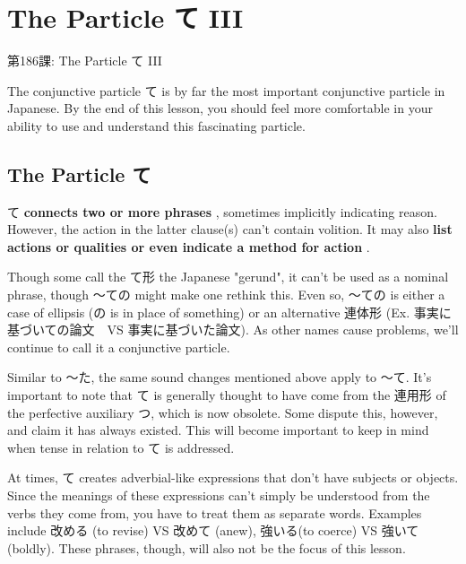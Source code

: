     
\chapter{The Particle て III}

\begin{center}
\begin{Large}
第186課: The Particle て III 
\end{Large}
\end{center}
 
\par{ The conjunctive particle て is by far the most important conjunctive particle in Japanese. By the end of this lesson, you should feel more comfortable in your ability to use and understand this fascinating particle. }
      
\section{The Particle て}
 
\par{ て \textbf{connects two or more phrases }, sometimes implicitly indicating reason. However, the action in the latter clause(s) can't contain volition. It may also \textbf{list actions or qualities or even indicate a method for action }. }

\par{ Though some call the て形 the Japanese "gerund", it can't be used as a nominal phrase, though ～ての might make one rethink this. Even so, ～ての is either a case of ellipsis (の is in place of something) or an alternative 連体形 (Ex. 事実に基づいての論文　VS 事実に基づいた論文). As other names cause problems, we'll continue to call it a conjunctive particle. }

\par{ Similar to ～た, the same sound changes mentioned above apply to ～て. It's important to note that て is generally thought to have come from the 連用形 of the perfective auxiliary つ, which is now obsolete. Some dispute this, however, and claim it has always existed. This will become important to keep in mind when tense in relation to て is addressed. }

\par{ At times, て creates adverbial-like expressions that don't have subjects or objects. Since the meanings of these expressions can't simply be understood from the verbs they come from, you have to treat them as separate words. Examples include 改める (to revise) VS 改めて (anew), 強いる(to coerce) VS 強いて (boldly). These phrases, though, will also not be the focus of this lesson. }

